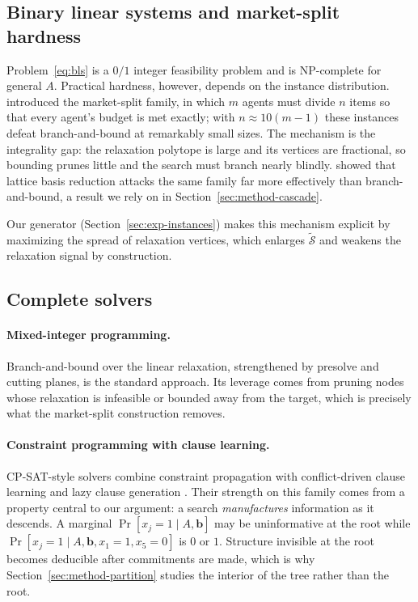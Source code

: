\documentclass[final,5p,times,twocolumn]{elsarticle}
\newcommand{\SOL}{\mathcal{S}}
\begin{document}
\subsection{Binary linear systems and market-split hardness}

Problem~\eqref{eq:bls} is a $0/1$ integer feasibility problem and is NP-complete for general $A$. Practical hardness, however, depends on the instance distribution. \citet{cornuejols1999market} introduced the market-split family, in which $m$ agents must divide $n$ items so that every agent's budget is met exactly; with $n\approx 10(m-1)$ these instances defeat branch-and-bound at remarkably small sizes. The mechanism is the integrality gap: the relaxation polytope is large and its vertices are fractional, so bounding prunes little and the search must branch nearly blindly. \citet{aardal2000market} showed that lattice basis reduction attacks the same family far more effectively than branch-and-bound, a result we rely on in Section~\ref{sec:method-cascade}.

Our generator (Section~\ref{sec:exp-instances}) makes this mechanism explicit by maximizing the spread of relaxation vertices, which enlarges $\tilde{\SOL}$ and weakens the relaxation signal by construction.

\subsection{Complete solvers}

\paragraph{Mixed-integer programming.} Branch-and-bound over the linear relaxation, strengthened by presolve and cutting planes, is the standard approach. Its leverage comes from pruning nodes whose relaxation is infeasible or bounded away from the target, which is precisely what the market-split construction removes.

\paragraph{Constraint programming with clause learning.} CP-SAT-style solvers combine constraint propagation with conflict-driven clause learning \citep{marquessilva1999grasp, moskewicz2001chaff} and lazy clause generation \citep{ohrimenko2009propagation}. Their strength on this family comes from a property central to our argument: a search \emph{manufactures} information as it descends. A marginal $\Pr[x_j=1\mid A,\mathbf{b}]$ may be uninformative at the root while $\Pr[x_j=1\mid A,\mathbf{b},x_1{=}1,x_5{=}0]$ is $0$ or $1$. Structure invisible at the root becomes deducible after commitments are made, which is why Section~\ref{sec:method-partition} studies the interior of the tree rather than the root.
\end{document}
